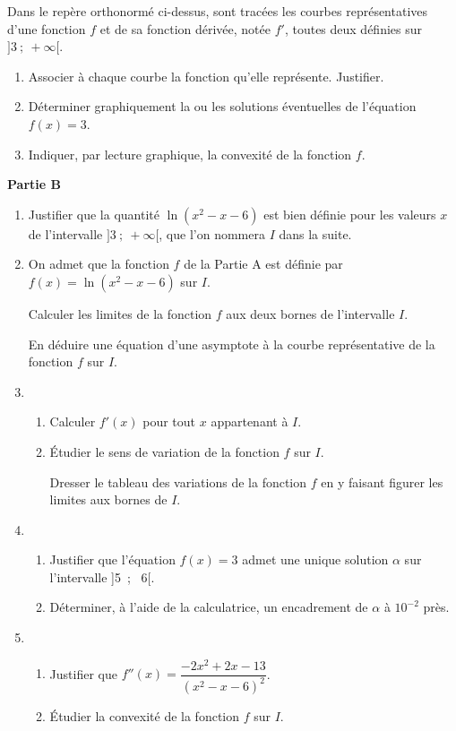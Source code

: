 \documentclass[11pt]{article}
\begin{document}
Dans le repère orthonormé ci-dessus, sont tracées les courbes représentatives d'une fonction $f$ et de sa fonction dérivée, notée $f'$, toutes deux définies sur $]3~;~+\infty[$.

\medskip

\begin{enumerate}
\item Associer à chaque courbe la fonction qu'elle représente. Justifier.
\item Déterminer graphiquement la ou les solutions éventuelles de l'équation $f(x) = 3$. 
\item Indiquer, par lecture graphique, la convexité de la fonction $f$.
\end{enumerate}

\bigskip

\textbf{Partie B}

\medskip

\begin{enumerate}
\item Justifier que la quantité $\ln \left(x^2- x- 6\right)$ est bien définie pour les valeurs $x$ de l'intervalle $]3~;~ +\infty[$, que l'on nommera $I$ dans la suite.
\item On admet que la fonction $f$ de la Partie A est définie par $f(x) = \ln \left(x^2- x- 6\right)$ sur $I$. 

Calculer les limites de la fonction $f$ aux deux bornes de l'intervalle $I$.

En déduire une équation d'une asymptote à la courbe représentative de la fonction $f$ sur $I$.
\item 
	\begin{enumerate}
		\item Calculer $f'(x)$ pour tout $x$ appartenant à $I$.
		\item Étudier le sens de variation de la fonction $f$ sur $I$.
		
Dresser le tableau des variations de la fonction $f$ en y faisant figurer les limites aux bornes de $I$.
	\end{enumerate}
\item 
	\begin{enumerate}
		\item Justifier que l'équation $f(x) = 3$ admet une unique solution $\alpha$ sur l'intervalle ]5~;~ 6[.
		\item Déterminer, à l'aide de la calculatrice, un encadrement de $\alpha$ à $10^{-2}$ près.
	\end{enumerate}
\item 
	\begin{enumerate}
		\item Justifier que $f''(x) = \dfrac{- 2x^2 + 2x - 13}{\left(x^2 - x - 6\right)^2}$.
		\item Étudier la convexité de la fonction $f$ sur $I$.
	\end{enumerate}
\end{enumerate}
\end{document}
